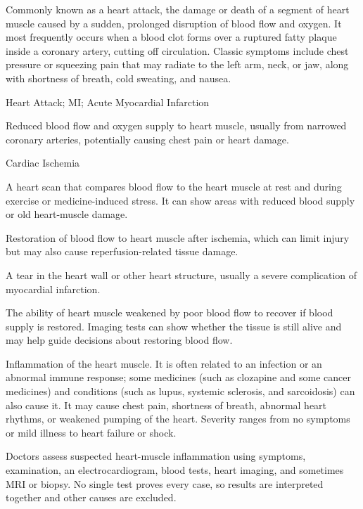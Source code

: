  Commonly known as a heart attack, the damage or death of a segment of heart muscle caused by a sudden, prolonged disruption of blood flow and oxygen. It most frequently occurs when a blood clot forms over a ruptured fatty plaque inside a coronary artery, cutting off circulation. Classic symptoms include chest pressure or squeezing pain that may radiate to the left arm, neck, or jaw, along with shortness of breath, cold sweating, and nausea.

\synonyms
Heart Attack; MI; Acute Myocardial Infarction

 Reduced blood flow and oxygen supply to heart muscle, usually from narrowed coronary arteries, potentially causing chest pain or heart damage.

\synonyms
Cardiac Ischemia

 A heart scan that compares blood flow to the heart muscle at rest and during exercise or medicine-induced stress. It can show areas with reduced blood supply or old heart-muscle damage.

 Restoration of blood flow to heart muscle after ischemia, which can limit injury but may also cause reperfusion-related tissue damage.

 A tear in the heart wall or other heart structure, usually a severe complication of myocardial infarction.

 The ability of heart muscle weakened by poor blood flow to recover if blood supply is restored. Imaging tests can show whether the tissue is still alive and may help guide decisions about restoring blood flow.

 Inflammation of the heart muscle. It is often related to an infection or an abnormal immune response; some medicines (such as clozapine and some cancer medicines) and conditions (such as lupus, systemic sclerosis, and sarcoidosis) can also cause it. It may cause chest pain, shortness of breath, abnormal heart rhythms, or weakened pumping of the heart. Severity ranges from no symptoms or mild illness to heart failure or shock.

 Doctors assess suspected heart-muscle inflammation using symptoms, examination, an electrocardiogram, blood tests, heart imaging, and sometimes MRI or biopsy. No single test proves every case, so results are interpreted together and other causes are excluded.


